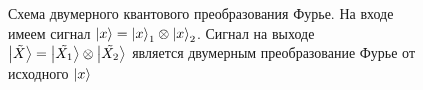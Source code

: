 \begin{figure}
\centering



\caption{Схема двумерного квантового преобразования Фурье. На входе
  имеем сигнал $\ket{x} = \ket{x}_1 \otimes \ket{x}_2$. Сигнал на
  выходе $\ket{\tilde{X}} = \ket{\tilde{X_1}} \otimes
  \ket{\tilde{X_2}}$ является двумерным преобразование Фурье от
  исходного $\ket{x}$}
\label{figQuantCompQuantFourier2d}
\end{figure}
